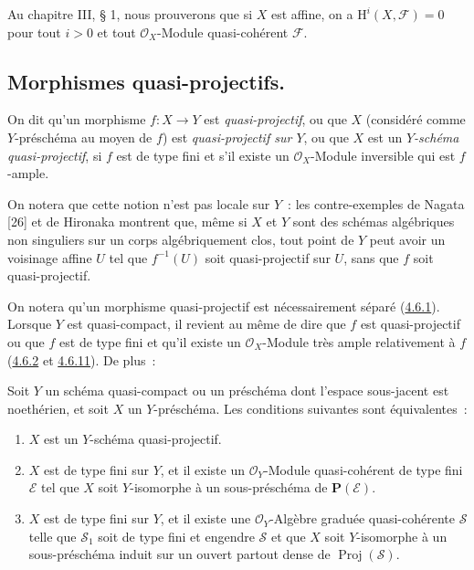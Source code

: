 \begin{remark}[5.2.4]
\label{II.5.2.4-fr}
Au chapitre III, § 1, nous prouverons que si $X$ est affine, on a
$\mathrm{H}^i(X,\mathcal{F})=0$ pour tout $i>0$ et tout
$\mathcal{O}_X$-Module quasi-cohérent $\mathcal{F}$.
\end{remark}

\subsection{Morphismes quasi-projectifs.}
\label{subsection:II.5.3-fr}

\begin{definition}[5.3.1]
\label{II.5.3.1-fr}
On dit qu'un morphisme $f:X\to Y$ est \emph{quasi-projectif}, ou que $X$
(considéré comme $Y$-préschéma au moyen de $f$) est \emph{quasi-projectif
sur $Y$}, ou que $X$ est un \emph{$Y$-schéma quasi-projectif}, si $f$ est de
type fini et s'il existe un $\mathcal{O}_X$-Module inversible qui est
$f$-ample.
\end{definition}

On notera que cette notion n'est pas locale sur $Y$~: les contre-exemples de
Nagata [26] et de Hironaka montrent que, même si $X$ et $Y$ sont des schémas
algébriques non singuliers sur un corps algébriquement clos, tout point de
$Y$ peut avoir un voisinage affine $U$ tel que $f^{-1}(U)$ soit
quasi-projectif sur $U$, sans que $f$ soit quasi-projectif.

On notera qu'un morphisme quasi-projectif est nécessairement séparé
(\hyperref[II.4.6.1-fr]{4.6.1}). Lorsque $Y$ est quasi-compact, il revient au
même de dire que $f$ est quasi-projectif ou que $f$ est de type fini et qu'il
existe un $\mathcal{O}_X$-Module très ample relativement à $f$
(\hyperref[II.4.6.2-fr]{4.6.2} et \hyperref[II.4.6.11-fr]{4.6.11}). De plus~:

\begin{proposition}[5.3.2]
\label{II.5.3.2-fr}
Soit $Y$ un schéma quasi-compact ou un préschéma dont l'espace sous-jacent
est noethérien, et soit $X$ un $Y$-préschéma. Les conditions suivantes sont
équivalentes~:
\begin{enumerate}
  \item[\rm{a)}] $X$ est un $Y$-schéma quasi-projectif.
  \item[\rm{b)}] $X$ est de type fini sur $Y$, et il existe un
  $\mathcal{O}_Y$-Module quasi-cohérent de type fini $\mathcal{E}$ tel que
  $X$ soit $Y$-isomorphe à un sous-préschéma de $\mathbf{P}(\mathcal{E})$.
  \item[\rm{c)}] $X$ est de type fini sur $Y$, et il existe une
  $\mathcal{O}_Y$-Algèbre graduée quasi-cohérente $\mathcal{S}$ telle que
  $\mathcal{S}_1$ soit de type fini et engendre $\mathcal{S}$ et que $X$
  soit $Y$-isomorphe à un sous-préschéma induit sur un ouvert partout dense
  de $\operatorname{Proj}(\mathcal{S})$.
\end{enumerate}
\end{proposition}

